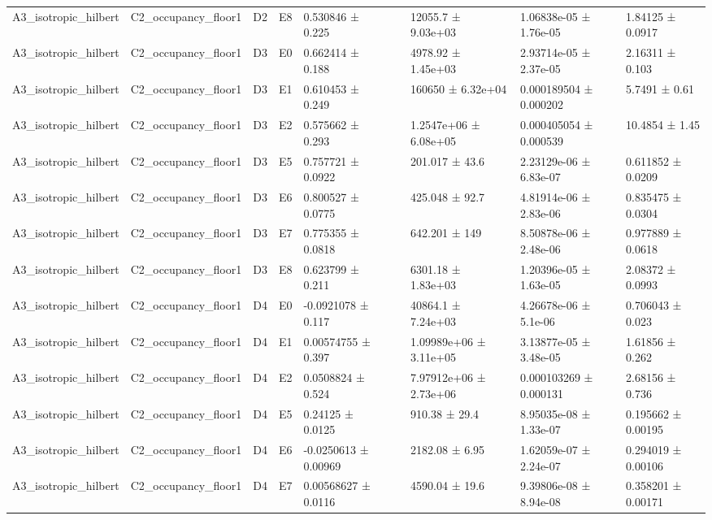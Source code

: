\begin{table}
\begin{tabular}{lllllllll}
A3\_isotropic\_hilbert & C2\_occupancy\_floor1 & D2 & E8 & 0.530846 ± 0.225 &  & 12055.7 ± 9.03e+03 & 1.06838e-05 ± 1.76e-05 & 1.84125 ± 0.0917 \\
A3\_isotropic\_hilbert & C2\_occupancy\_floor1 & D3 & E0 & 0.662414 ± 0.188 &  & 4978.92 ± 1.45e+03 & 2.93714e-05 ± 2.37e-05 & 2.16311 ± 0.103 \\
A3\_isotropic\_hilbert & C2\_occupancy\_floor1 & D3 & E1 & 0.610453 ± 0.249 &  & 160650 ± 6.32e+04 & 0.000189504 ± 0.000202 & 5.7491 ± 0.61 \\
A3\_isotropic\_hilbert & C2\_occupancy\_floor1 & D3 & E2 & 0.575662 ± 0.293 &  & 1.2547e+06 ± 6.08e+05 & 0.000405054 ± 0.000539 & 10.4854 ± 1.45 \\
A3\_isotropic\_hilbert & C2\_occupancy\_floor1 & D3 & E5 & 0.757721 ± 0.0922 &  & 201.017 ± 43.6 & 2.23129e-06 ± 6.83e-07 & 0.611852 ± 0.0209 \\
A3\_isotropic\_hilbert & C2\_occupancy\_floor1 & D3 & E6 & 0.800527 ± 0.0775 &  & 425.048 ± 92.7 & 4.81914e-06 ± 2.83e-06 & 0.835475 ± 0.0304 \\
A3\_isotropic\_hilbert & C2\_occupancy\_floor1 & D3 & E7 & 0.775355 ± 0.0818 &  & 642.201 ± 149 & 8.50878e-06 ± 2.48e-06 & 0.977889 ± 0.0618 \\
A3\_isotropic\_hilbert & C2\_occupancy\_floor1 & D3 & E8 & 0.623799 ± 0.211 &  & 6301.18 ± 1.83e+03 & 1.20396e-05 ± 1.63e-05 & 2.08372 ± 0.0993 \\
A3\_isotropic\_hilbert & C2\_occupancy\_floor1 & D4 & E0 & -0.0921078 ± 0.117 &  & 40864.1 ± 7.24e+03 & 4.26678e-06 ± 5.1e-06 & 0.706043 ± 0.023 \\
A3\_isotropic\_hilbert & C2\_occupancy\_floor1 & D4 & E1 & 0.00574755 ± 0.397 &  & 1.09989e+06 ± 3.11e+05 & 3.13877e-05 ± 3.48e-05 & 1.61856 ± 0.262 \\
A3\_isotropic\_hilbert & C2\_occupancy\_floor1 & D4 & E2 & 0.0508824 ± 0.524 &  & 7.97912e+06 ± 2.73e+06 & 0.000103269 ± 0.000131 & 2.68156 ± 0.736 \\
A3\_isotropic\_hilbert & C2\_occupancy\_floor1 & D4 & E5 & 0.24125 ± 0.0125 &  & 910.38 ± 29.4 & 8.95035e-08 ± 1.33e-07 & 0.195662 ± 0.00195 \\
A3\_isotropic\_hilbert & C2\_occupancy\_floor1 & D4 & E6 & -0.0250613 ± 0.00969 &  & 2182.08 ± 6.95 & 1.62059e-07 ± 2.24e-07 & 0.294019 ± 0.00106 \\
A3\_isotropic\_hilbert & C2\_occupancy\_floor1 & D4 & E7 & 0.00568627 ± 0.0116 &  & 4590.04 ± 19.6 & 9.39806e-08 ± 8.94e-08 & 0.358201 ± 0.00171 \\

\end{tabular}
\end{table}

